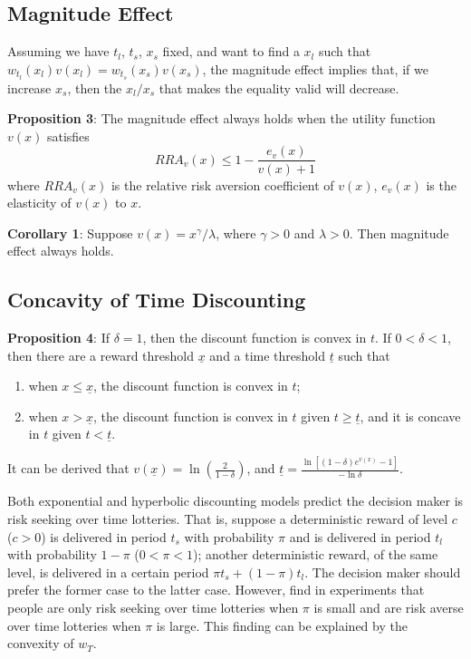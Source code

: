 \documentclass[
  12pt,
]{article}
\providecommand{\tightlist}{%
  \setlength{\itemsep}{0pt}\setlength{\parskip}{0pt}}
\begin{document}
\hypertarget{magnitude-effect}{%
\subsection{Magnitude Effect}\label{magnitude-effect}}

Assuming we have \(t_l\), \(t_s\), \(x_s\) fixed, and want to find a
\(x_l\) such that \(w_{t_l}(x_l)v(x_l) = w_{t_s}(x_s)v(x_s)\), the
magnitude effect implies that, if we increase \(x_s\), then the
\(x_l/x_s\) that makes the equality valid will decrease.

\textbf{Proposition 3}: The magnitude effect always holds when the
utility function \(v(x)\) satisfies\[
RRA_v(x)\leq 1-\frac{e_v(x)}{v(x)+1}
\]where \(RRA_v(x)\) is the relative risk aversion coefficient of
\(v(x)\), \(e_v(x)\) is the elasticity of \(v(x)\) to \(x\).

\textbf{Corollary 1}: Suppose \(v(x)=x^\gamma/\lambda\), where
\(\gamma>0\) and \(\lambda>0\). Then magnitude effect always holds.

\hypertarget{concavity-of-time-discounting}{%
\subsection{Concavity of Time
Discounting}\label{concavity-of-time-discounting}}

\textbf{Proposition 4}: If \(\delta =1\), then the discount function is
convex in \(t\). If \(0<\delta<1\), then there are a reward threshold
\(\underline{x}\) and a time threshold \(\underline{t}\) such that

\begin{enumerate}
\def\labelenumi{\arabic{enumi}.}
\tightlist
\item
  when \(x\leq \underline{x}\), the discount function is convex in
  \(t\);
\item
  when \(x > \underline{x}\), the discount function is convex in \(t\)
  given \(t\geq \underline{t}\), and it is concave in \(t\) given
  \(t<\underline{t}\).
\end{enumerate}

It can be derived that \(v(\underline{x})=\ln(\frac{2}{1-\delta})\), and
\(\underline{t}=\frac{\ln[(1-\delta)e^{v(x)}-1]}{-\ln\delta}\).

Both exponential and hyperbolic discounting models predict the decision
maker is risk seeking over time lotteries. That is, suppose a
deterministic reward of level \(c\) (\(c>0\)) is delivered in period
\(t_s\) with probability \(\pi\) and is delivered in period \(t_l\) with
probability \(1-\pi\) (\(0<\pi<1\)); another deterministic reward, of
the same level, is delivered in a certain period
\(\pi t_s +(1-\pi) t_l\). The decision maker should prefer the former
case to the latter case. However, \citet{onay_intertemporal_2007} find
in experiments that people are only risk seeking over time lotteries
when \(\pi\) is small and are risk averse over time lotteries when
\(\pi\) is large. This finding can be explained by the convexity of
\(w_T\).
\end{document}
